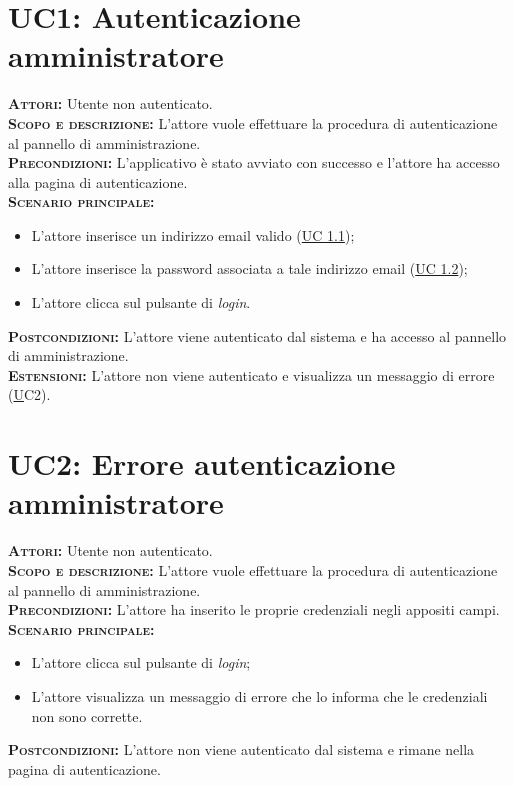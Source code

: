 \setlength{\parindent}{0cm}
\section{UC1: Autenticazione amministratore}
\label{sec:uc1}
\textsc{\textsc{\textbf{Attori:}}} Utente non autenticato.\\
\textsc{\textbf{Scopo e descrizione:}} L'attore vuole effettuare la procedura di autenticazione al pannello di amministrazione.\\
\textsc{\textsc{\textbf{Precondizioni:}}} L'applicativo è stato avviato con successo e l'attore ha accesso alla pagina di autenticazione.\\
\textsc{\textbf{Scenario principale:}}
\begin{itemize}
    \item L'attore inserisce un indirizzo email valido (\hyperref[sec:uc11]{UC 1.1});
    \item L'attore inserisce la password associata a tale indirizzo email (\hyperref[sec:uc12]{UC 1.2});
    \item L'attore clicca sul pulsante di \textit{login}.
\end{itemize}
\textsc{\textbf{Postcondizioni:}} L'attore viene autenticato dal sistema e ha accesso al pannello di amministrazione.\\
\textsc{\textbf{Estensioni:}} L'attore non viene autenticato e visualizza un messaggio di errore (\hyperref[sec:uc2]UC2{}).

\section{UC2: Errore autenticazione amministratore}
\label{sec:uc2}
\textsc{\textbf{Attori:}} Utente non autenticato.\\
\textsc{\textbf{Scopo e descrizione:}} L'attore vuole effettuare la procedura di autenticazione al pannello di amministrazione.\\
\textsc{\textsc{\textbf{Precondizioni:}}} L'attore ha inserito le proprie credenziali negli appositi campi.\\
\textsc{\textbf{Scenario principale:}}
\begin{itemize}
    \item L'attore clicca sul pulsante di \textit{login};
    \item L'attore visualizza un messaggio di errore che lo informa che le credenziali non sono corrette.
\end{itemize}
\textsc{\textbf{Postcondizioni:}} L'attore non viene autenticato dal sistema e rimane nella pagina di autenticazione.


